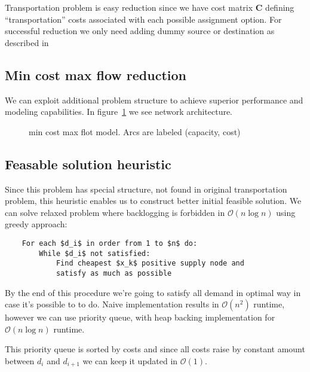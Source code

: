 Transportation problem \autocite{or-textbook} is easy reduction since we have cost matrix $\mathbf{C}$ defining ``transportation'' costs associated with each possible assignment option. For successful reduction we only need adding dummy source or destination as described in \autocite{or-textbook}


\subsection{Min cost max flow reduction}
\label{sub:Min cost max flow reduction}

We can exploit additional problem structure to achieve superior performance and modeling capabilities. In figure~\ref{fig:mcmf-model} we see network architecture.

\begin{figure}[h]
    \label{fig:mcmf-model}
    \centering
    
    \caption{min cost max flot model. Arcs are labeled (capacity, cost)}
\end{figure}

\subsection{Feasable solution heuristic}
\label{subs:Feasable solution heuristic}
Since this problem has special structure, not found in original transportation problem, this heuristic enables us to construct better initial feasible solution. We can solve relaxed problem where backlogging is forbidden in $\mathcal{O}(n \log{} n)$ using greedy approach:

\begin{verbatim}
    For each $d_i$ in order from 1 to $n$ do:
        While $d_i$ not satisfied:
            Find cheapest $x_k$ positive supply node and
            satisfy as much as possible
\end{verbatim}

By the end of this procedure we're going to satisfy all demand in optimal way in case it's possible to to do. Naive implementation results in $\mathcal{O}(n^2)$ runtime, however we can use priority queue, with heap backing implementation for $\mathcal{O}(n\log{}n)$ runtime.

This priority queue is sorted by costs and since all costs raise by constant amount between $d_i$ and $d_{i+1}$ we can keep it updated in $\mathcal{O}(1)$.

